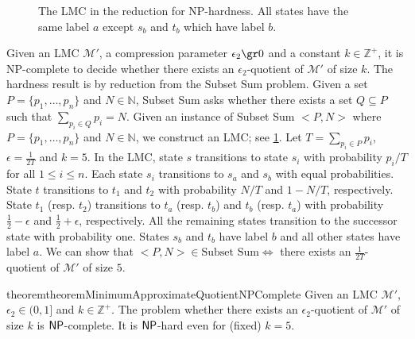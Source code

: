 \documentclass[a4paper,UKenglish,cleveref,autoref,thm-restate]{lipics-v2021}
\newcommand{\nat}{\mathbb{N}}
\newcommand{\integer}{\mathbb{Z}}
\newcommand{\Hyp}{\mathcal{M}'}%
\newcommand{\errorParam}{\epsilon_2}%
\newcommand{\modify}[1]{{\color{black}#1}}
\begin{document}
\begin{figure}[h]
\begin{minipage}{0.45\linewidth}
	\end{minipage}
	\caption{The LMC in the reduction for {\sf NP}-hardness. All states have the same label $a$ except $s_b$ and $t_b$ which have label $b$.
	}\label{fig:reductionfromSubsset}
\end{figure}

Given an LMC $\Hyp$, a compression parameter $\errorParam \gr 0$ and a constant $k \in \integer^{+}$, it is {\sf NP}-complete to decide whether there exists an $\errorParam$-quotient of $\Hyp$ of size $k$. The hardness result is by reduction from the Subset Sum problem. Given a set $P =\{p_1, \ldots, p_n\}$ and $N \in \nat$, Subset Sum asks whether there exists a set $Q \subseteq P$ such that $\sum_{p_i \in Q} p_i = N$. Given an instance of Subset Sum $<P, N>$ where $P =\{p_1, \ldots, p_n\}$ and $N \in \nat$, we construct an LMC; see \cref{fig:reductionfromSubsset}. Let $T = \sum_{p_i \in P} p_i$, $\epsilon = \frac{1}{2T}$ and $k = 5$. \modify{In the LMC, state $s$ transitions to state $s_i$ with probability $p_i / T$ for all $1 \le  i \le n$. Each state $s_i$ transitions to $s_a$ and $s_b$ with equal probabilities. State $t$ transitions to $t_1$ and $t_2$ with probability $N / T$ and $1 - N / T$, respectively. State $t_1$ (resp. $t_2$) transitions to $t_a$ (resp. $t_b$) and $t_b$ (resp. $t_a$) with probability $\frac{1}{2} - \epsilon$ and $\frac{1}{2} + \epsilon$, respectively. All the remaining states transition to the successor state with probability one. States $s_b$ and $t_b$ have label $b$ and all other states have label $a$.} We can show that $<P, N> \in {\mbox{Subset Sum}} \iff$ there exists an $\frac{1}{2T}$-quotient of $\Hyp$ of size $5$.

\begin{restatable}{theorem}{theoremMinimumApproximateQuotientNPComplete}\label{theorem: minimum-approximate-quotient-NP-complete}
	Given an LMC $\Hyp$, $\errorParam \in (0, 1]$ and $k \in \integer^{+}$. The problem whether there exists an $\errorParam$-quotient of $\Hyp$ of size $k$ is $\sf NP$-complete. It is $\sf NP$-hard even for (fixed) $k=5$.
\end{restatable}
\end{document}
